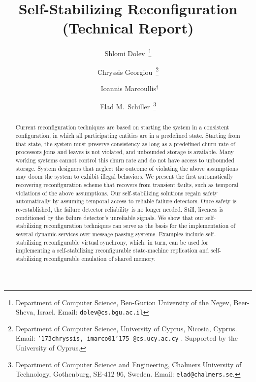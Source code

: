 \documentclass[11pt]{article}
\begin{document}
\begin{titlepage}
\renewcommand{\thefootnote}{\fnsymbol{footnote}}



\title{Self-Stabilizing Reconfiguration\\ \large{(Technical Report)}
}



\author{Shlomi Dolev~\footnote{Department of Computer Science, Ben-Gurion University of the Negev, Beer-Sheva, Israel. Email: {\tt dolev@cs.bgu.ac.il} }
\and Chryssis Georgiou~\footnote{ Department of Computer Science, University of Cyprus, Nicosia, Cyprus. Email: {\tt {\char '173}chryssis, imarco01{\char '175} @cs.ucy.ac.cy} . Supported by the University of Cyprus.} \and~Ioannis Marcoullis$^\dag$ \and Elad M.\ Schiller~\footnote{Department of Computer Science and Engineering, Chalmers University of Technology, Gothenburg, SE-412 96, Sweden. Email: {\tt elad@chalmers.se}.}}

\date{}

\maketitle

\thispagestyle{empty}




\begin{abstract}
Current reconfiguration techniques are based on starting the system in a consistent configuration, in which all participating entities are in a predefined state. Starting from that state, the system must preserve consistency as long as a predefined churn rate of processors joins and leaves is not violated, and unbounded storage is available.
Many working systems cannot control this churn rate and do not have access to unbounded storage. System designers that neglect the outcome of violating the above assumptions may doom the system to exhibit illegal behaviors. We present the first automatically recovering reconfiguration scheme that recovers from transient faults, such as temporal violations of the above assumptions. Our self-stabilizing solutions regain safety automatically by assuming temporal access to reliable failure detectors. Once safety is re-established, the failure detector reliability is no longer needed. Still, liveness is conditioned by the failure detector's unreliable signals. We show
that our self-stabilizing reconfiguration techniques can serve as the basis for the
implementation of several dynamic services over message passing systems. 
Examples include  
self-stabilizing reconfigurable virtual synchrony, which, in turn, can be used for implementing a self-stabilizing  
reconfigurable state-machine replication and self-stabilizing reconfigurable emulation of shared memory.
\vspace{2em}


\end{abstract}
\end{titlepage}
\end{document}
